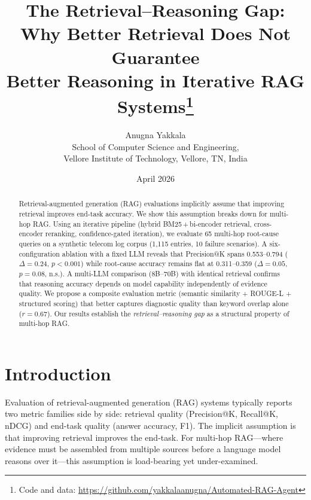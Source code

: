 \documentclass[11pt,a4paper]{article}
\title{The Retrieval--Reasoning Gap: Why Better Retrieval Does Not Guarantee\\Better Reasoning in Iterative RAG Systems\thanks{Code and data: \url{https://github.com/yakkalaanugna/Automated-RAG-Agent}}}
\author{Anugna Yakkala \\[4pt]
{\normalsize School of Computer Science and Engineering,}\\
{\normalsize Vellore Institute of Technology, Vellore, TN, India}}
\date{April 2026}
\begin{document}
\maketitle


\begin{abstract}
Retrieval-augmented generation (RAG) evaluations implicitly assume that
improving retrieval improves end-task accuracy.  We show this assumption
breaks down for multi-hop RAG.
Using an iterative pipeline (hybrid BM25\,+\,bi-encoder retrieval,
cross-encoder reranking, confidence-gated iteration), we evaluate
65 multi-hop root-cause queries on a synthetic telecom log corpus
(1{,}115 entries, 10 failure scenarios).
A six-configuration ablation with a fixed LLM reveals that
Precision@K spans 0.553--0.794 ($\Delta{=}0.24$,
$p{<}0.001$) while root-cause accuracy remains flat at
0.311--0.359 ($\Delta{=}0.05$, $p{=}0.08$, n.s.).
A multi-LLM comparison (8B--70B) with identical retrieval confirms
that reasoning accuracy depends on model capability independently
of evidence quality.
We propose a composite evaluation metric (semantic similarity +
ROUGE-L + structured scoring) that better captures diagnostic
quality than keyword overlap alone ($r{=}0.67$).
Our results establish the \emph{retrieval--reasoning gap} as a
structural property of multi-hop RAG.
\end{abstract}


\section{Introduction}

Evaluation of retrieval-augmented generation (RAG) systems
\citep{lewis2020rag,gao2023ragsurvey} typically reports two metric
families side by side: retrieval quality (Precision@K, Recall@K, nDCG)
and end-task quality (answer accuracy, F1).
The implicit assumption is that improving retrieval improves the
end-task.
For multi-hop RAG---where evidence must be assembled from multiple
sources before a language model reasons over it---this assumption is
load-bearing yet under-examined.
\end{document}
